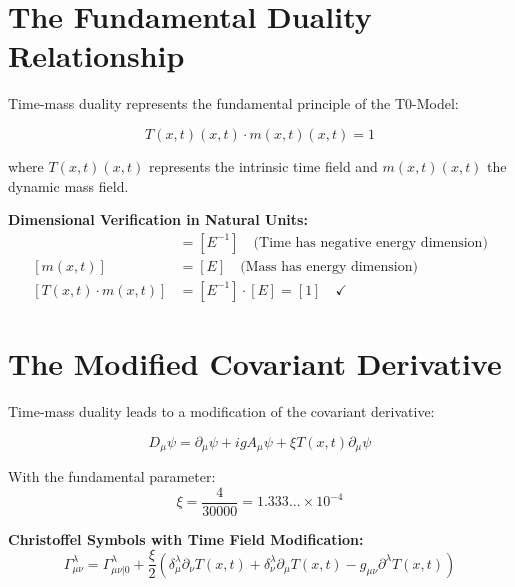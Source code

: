 \documentclass[12pt,a4paper]{report}
\newcommand{\Tfield}{T(x,t)}  %
\newcommand{\mfield}{m(x,t)}  %
\newcommand{\xipar}{\xi}      %
\begin{document}
\section{The Fundamental Duality Relationship}\label{sec:duality_relationship}

Time-mass duality represents the fundamental principle of the T0-Model:

\begin{equation}\label{eq:time_mass_duality_fundamental}
	\Tfield(x,t) \cdot \mfield(x,t) = 1
\end{equation}

where $\Tfield(x,t)$ represents the intrinsic time field and $\mfield(x,t)$ the dynamic mass field.

\textbf{Dimensional Verification in Natural Units:}
\begin{align}
	[\Tfield] &= [E^{-1}] \quad \text{(Time has negative energy dimension)} \\
	[\mfield] &= [E] \quad \text{(Mass has energy dimension)} \\
	[\Tfield \cdot \mfield] &= [E^{-1}] \cdot [E] = [1] \quad \checkmark
\end{align}

\section{The Modified Covariant Derivative}\label{sec:covariant_derivative}

Time-mass duality leads to a modification of the covariant derivative:

\begin{equation}\label{eq:modified_covariant_derivative}
	D_\mu \psi = \partial_\mu \psi + ig A_\mu \psi + \xipar \Tfield \partial_\mu \psi
\end{equation}

With the fundamental parameter:
\begin{equation}
	\xipar = \frac{4}{30000} = 1.333... \times 10^{-4}
\end{equation}

\textbf{Christoffel Symbols with Time Field Modification:}
\begin{equation}\label{eq:christoffel_timefield}
	\Gamma^\lambda_{\mu\nu} = \Gamma^\lambda_{\mu\nu|0} + \frac{\xipar}{2} \left(\delta^\lambda_\mu \partial_\nu \Tfield + \delta^\lambda_\nu \partial_\mu \Tfield - g_{\mu\nu} \partial^\lambda \Tfield\right)
\end{equation}
\end{document}

